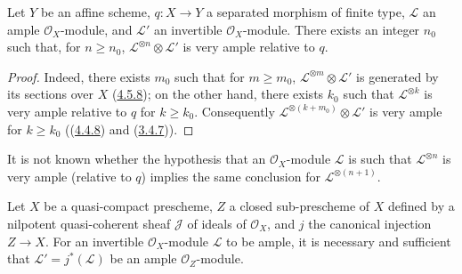 \begin{corollary}[4.5.11]
\label{II.4.5.11}
Let $Y$ be an affine scheme, $q:X\to Y$ a separated morphism of finite type,
$\mathcal{L}$ an ample $\mathcal{O}_X$-module, and $\mathcal{L}'$ an
invertible $\mathcal{O}_X$-module. There exists an integer $n_0$ such that, for
$n\geq n_0$, $\mathcal{L}^{\otimes n}\otimes\mathcal{L}'$ is very ample
relative to $q$.
\end{corollary}

\begin{proof}
Indeed, there exists $m_0$ such that for $m\geq m_0$,
$\mathcal{L}^{\otimes m}\otimes\mathcal{L}'$ is generated by its sections
over $X$ (\hyperref[II.4.5.8]{4.5.8}); on the other hand, there exists
$k_0$ such that $\mathcal{L}^{\otimes k}$ is very ample relative to $q$
for $k\geq k_0$. Consequently
$\mathcal{L}^{\otimes(k+m_0)}\otimes\mathcal{L}'$ is very ample for
$k\geq k_0$ ((\hyperref[II.4.4.8]{4.4.8}) and
(\hyperref[II.3.4.7]{3.4.7})).
\end{proof}

\begin{remark}[4.5.12]
\label{II.4.5.12}
It is not known whether the hypothesis that an $\mathcal{O}_X$-module $\mathcal{L}$ is such
that $\mathcal{L}^{\otimes n}$ is very ample (relative to $q$) implies
the same conclusion for $\mathcal{L}^{\otimes(n+1)}$.
\end{remark}

\begin{proposition}[4.5.13]
\label{II.4.5.13}
Let $X$ be a quasi-compact prescheme, $Z$ a closed sub-prescheme of $X$
defined by a nilpotent quasi-coherent sheaf $\mathcal{J}$ of ideals of
$\mathcal{O}_X$, and $j$ the canonical injection $Z\to X$. For an
invertible $\mathcal{O}_X$-module $\mathcal{L}$ to be ample, it is necessary and
sufficient that $\mathcal{L}'=j^*(\mathcal{L})$ be an ample
$\mathcal{O}_Z$-module.
\end{proposition}

